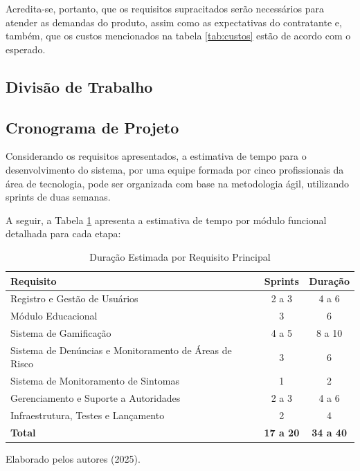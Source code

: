 \documentclass[a5paper, 12pt]{article}
\begin{document}
Acredita-se, portanto, que os requisitos supracitados serão necessários para atender as demandas do produto, assim como as expectativas do contratante e, também, que os custos mencionados na tabela \ref{tab:custos} estão de acordo com o esperado.

\newpage

\subsection{Divisão de Trabalho}


\subsection{Cronograma de Projeto}

Considerando os requisitos apresentados, a estimativa de tempo para o desenvolvimento do sistema, por uma equipe formada por cinco profissionais da área de tecnologia, pode ser organizada com base na metodologia ágil, utilizando sprints de duas semanas.

A seguir, a Tabela \ref{tab:cronograma}  apresenta a estimativa de tempo por módulo funcional detalhada para cada etapa:

\begin{table}[h]
\centering
\caption{Duração Estimada por Requisito Principal}
\label{tab:cronograma}
\begin{tabular}{|l|c|c|}
\hline
\textbf{Requisito} & \textbf{Sprints} & \textbf{Duração} \\
\hline
Registro e Gestão de Usuários & 2 a 3 & 4 a 6 \\
Módulo Educacional & 3  & 6 \\
Sistema de Gamificação & 4 a 5  & 8 a 10 \\
Sistema de Denúncias e Monitoramento de Áreas de Risco & 3  & 6  \\
Sistema de Monitoramento de Sintomas & 1  & 2  \\
Gerenciamento e Suporte a Autoridades & 2 a 3  & 4 a 6  \\
Infraestrutura, Testes e Lançamento & 2  & 4 \\
\hline
\textbf{Total} & \textbf{17 a 20} & \textbf{34 a 40} \\
\hline
\end{tabular}

\smallskip
Elaborado pelos autores (2025).
\end{table}
\end{document}

